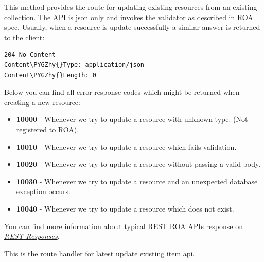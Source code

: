 \documentclass[letterpaper,10pt,english]{sphinxmanual}
\def\PYGZhy{\char`\-}
\begin{document}
\begin{fulllineitems}
\begin{fulllineitems}
\end{fulllineitems}


\begin{fulllineitems}
\label{features/roa/technical_summary:fantastico.contrib.roa_discovery.roa_controller.RoaController.update_item}
This method provides the route for updating existing resources from an existing collection.
The API is json only and invokes the validator as described in ROA spec.
Usually, when a resource is update successfully a similar answer is returned to the client:

\begin{Verbatim}[commandchars=\\\{\}]
204 No Content
Content\PYGZhy{}Type: application/json
Content\PYGZhy{}Length: 0
\end{Verbatim}

Below you can find all error response codes which might be returned when creating a new resource:
\begin{itemize}
\item {} 
\textbf{10000} - Whenever we try to update a resource with unknown type. (Not registered to ROA).

\item {} 
\textbf{10010} - Whenever we try to update a resource which fails validation.

\item {} 
\textbf{10020} - Whenever we try to update a resource without passing a valid body.

\item {} 
\textbf{10030} - Whenever we try to update a resource and an unexpected database exception occurs.

\item {} 
\textbf{10040} - Whenever we try to update a resource which does not exist.

\end{itemize}

You can find more information about typical REST ROA APIs response on {\hyperref[features/roa/rest_responses::doc]{\emph{REST Responses}}}.

\end{fulllineitems}


\begin{fulllineitems}
\label{features/roa/technical_summary:fantastico.contrib.roa_discovery.roa_controller.RoaController.update_item_latest}
This is the route handler for latest update existing item api.

\end{fulllineitems}


\end{fulllineitems}
\end{document}
